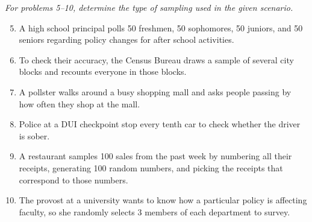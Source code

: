 \emph{For problems 5--10, determine the type of sampling used in the given scenario.}
\begin{enumerate}
\setcounter{enumi}{4}
\item A high school principal polls 50 freshmen, 50 sophomores, 50 juniors, and 50 seniors regarding policy changes for after school activities. 

\item To check their accuracy, the Census Bureau draws a sample of several city blocks and recounts everyone in those blocks. 

\item A pollster walks around a busy shopping mall and asks people passing by how often they shop at the mall. 

\item Police at a DUI checkpoint stop every tenth car to check whether the driver is sober. 

\item A restaurant samples 100 sales from the past week by numbering all their receipts, generating 100 random numbers, and picking the receipts that correspond to those numbers. 

\item The provost at a university wants to know how a particular policy is affecting faculty, so she randomly selects 3 members of each department to survey. 
\end{enumerate}
